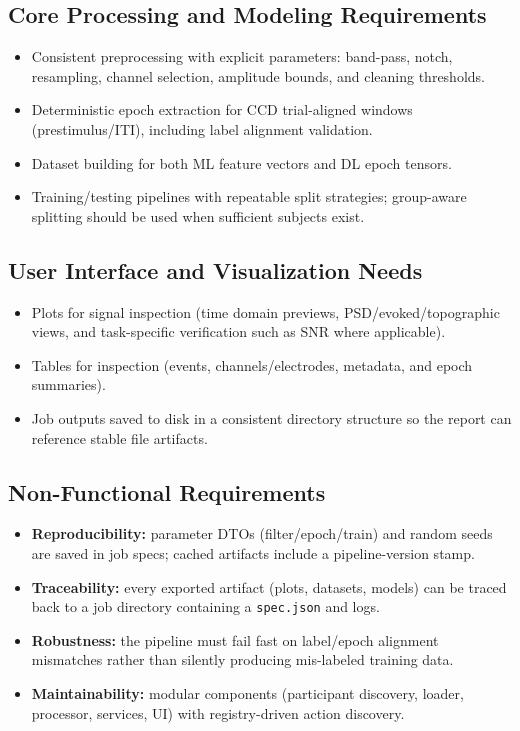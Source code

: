 \subsection{Core Processing and Modeling Requirements}
\label{subsec:core-processing}
\begin{itemize}
    \item Consistent preprocessing with explicit parameters: band-pass, notch, resampling, channel selection, amplitude bounds, and cleaning thresholds.
    \item Deterministic epoch extraction for CCD trial-aligned windows (prestimulus/ITI), including label alignment validation.
    \item Dataset building for both ML feature vectors and DL epoch tensors.
    \item Training/testing pipelines with repeatable split strategies; group-aware splitting should be used when sufficient subjects exist.
\end{itemize}

\subsection{User Interface and Visualization Needs}
\label{subsec:ui-needs}
\begin{itemize}
    \item Plots for signal inspection (time domain previews, PSD/evoked/topographic views, and task-specific verification such as SNR where applicable).
    \item Tables for inspection (events, channels/electrodes, metadata, and epoch summaries).
    \item Job outputs saved to disk in a consistent directory structure so the report can reference stable file artifacts.
\end{itemize}

\subsection{Non-Functional Requirements}
\label{subsec:non-functional}
\begin{itemize}
    \item \textbf{Reproducibility:} parameter DTOs (filter/epoch/train) and random seeds are saved in job specs; cached artifacts include a pipeline-version stamp.
    \item \textbf{Traceability:} every exported artifact (plots, datasets, models) can be traced back to a job directory containing a \texttt{spec.json} and logs.
    \item \textbf{Robustness:} the pipeline must fail fast on label/epoch alignment mismatches rather than silently producing mis-labeled training data.
    \item \textbf{Maintainability:} modular components (participant discovery, loader, processor, services, UI) with registry-driven action discovery.
\end{itemize}

